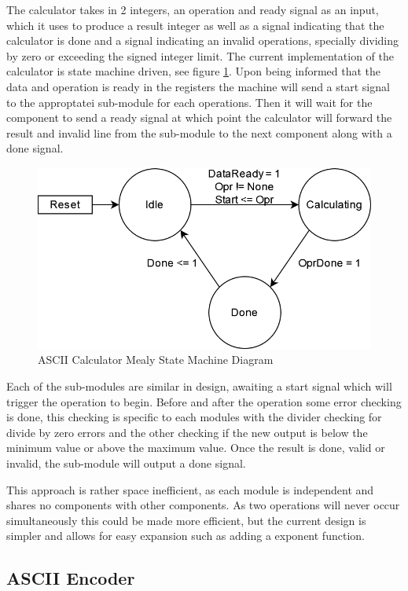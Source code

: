 \documentclass[11pt]{article}
\begin{document}
The calculator takes in 2 integers, an operation and ready signal as an input, which it uses to produce a result integer as well as a signal indicating that the calculator is done and a signal indicating an invalid operations, specially dividing by zero or exceeding the signed integer limit.
The current implementation of the calculator is state machine driven, see figure \ref{fig:calcsm}. 
Upon being informed that the data and operation is ready in the registers the machine will send a start signal to the approptatei sub-module for each operations.
Then it will wait for the component to send a ready signal at which point the calculator will forward the result and invalid line from the sub-module to the next component along with a done signal.

\begin{figure}[H]        
    \centering
    \includegraphics[width=.66\textwidth]{CalculatorSM.drawio.png}
    \caption{ASCII Calculator Mealy State Machine Diagram}
    \label{fig:calcsm}
\end{figure} 

Each of the sub-modules are similar in design, awaiting a start signal which will trigger the operation to begin.
Before and after the operation some error checking is done,
this checking is specific to each modules with the divider checking for divide by zero errors and the other checking if the new output is below the minimum value or above the maximum value.
Once the result is done, valid or invalid, the sub-module will output a done signal.

This approach is rather space inefficient, as each module is independent and shares no components with other components.
As two operations will never occur simultaneously this could be made more efficient,
but the current design is simpler and allows for easy expansion such as adding a exponent function.

\subsection{ASCII Encoder}
\end{document}

